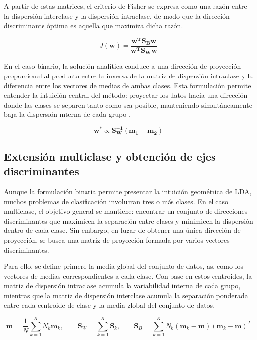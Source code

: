 A partir de estas matrices, el criterio de Fisher se expresa como una razón entre la dispersión interclase y la dispersión intraclase, de modo que la dirección discriminante óptima es aquella que maximiza dicha razón.


\begin{equation}
	J\mathbf{(w)} = \mathbf{\frac{w^TS_Bw}{w^TS_Ww}}	
	\label{eq:EMT3}
\end{equation}

En el caso binario, la solución analítica conduce a una dirección de proyección proporcional al producto entre la inversa de la matriz de dispersión intraclase y la diferencia entre los vectores de medias de ambas clases. Esta formulación permite entender la intuición central del método: proyectar los datos hacia una dirección donde las clases se separen tanto como sea posible, manteniendo simultáneamente baja la dispersión interna de cada grupo \cite{bishop2006pattern}.

\begin{equation}
	\mathbf{w^*} \propto \mathbf{S_W^{-1}(m_1-m_2)}
	\label{eq:EMT4}
\end{equation}

\subsection{Extensión multiclase y obtención de ejes discriminantes}

Aunque la formulación binaria permite presentar la intuición geométrica de LDA, muchos problemas de clasificación involucran tres o más clases. En el caso multiclase, el objetivo general se mantiene: encontrar un conjunto de direcciones discriminantes que maximicen la separación entre clases y minimicen la dispersión dentro de cada clase. Sin embargo, en lugar de obtener una única dirección de proyección, se busca una matriz de proyección formada por varios vectores discriminantes.

Para ello, se define primero la media global del conjunto de datos, así como los vectores de medias correspondientes a cada clase. Con base en estos centroides, la matriz de dispersión intraclase acumula la variabilidad interna de cada grupo, mientras que la matriz de dispersión interclase acumula la separación ponderada entre cada centroide de clase y la media global del conjunto de datos.

\begin{equation}
	\mathbf{m} = \frac{1}{N} \sum_{k=1}^K N_k \mathbf{m}_k, \qquad \mathbf{S}_W = \sum_{k=1}^K \mathbf{S}_k, \qquad \mathbf{S}_B = \sum_{k=1}^K N_k (\mathbf{m}_k - \mathbf{m})(\mathbf{m}_k - \mathbf{m})^T
	\label{eq:EMT5}
\end{equation}

